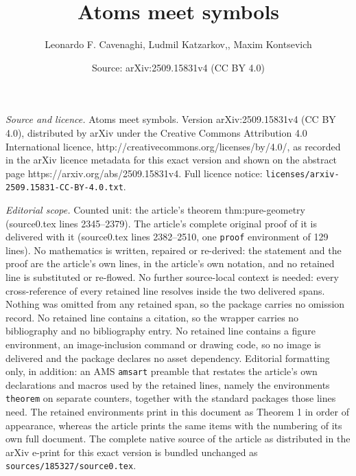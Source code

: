 \documentclass[10pt,a4paper]{amsart}
\title{Atoms meet symbols}
\author{Leonardo F. Cavenaghi, Ludmil Katzarkov,, Maxim Kontsevich}
\date{Source: arXiv:2509.15831v4 (CC BY 4.0)}
\begin{document}
\maketitle

\noindent\emph{Source and licence.} Atoms meet symbols. Version arXiv:2509.15831v4 (CC BY 4.0), distributed by arXiv under the Creative Commons Attribution 4.0 International licence, http://creativecommons.org/licenses/by/4.0/, as recorded in the arXiv licence metadata for this exact version and shown on the abstract page https://arxiv.org/abs/2509.15831v4. Full licence notice: \texttt{licenses/arxiv-2509.15831-CC-BY-4.0.txt}.\par\smallskip

\noindent\textit{Editorial scope.} Counted unit: the article's theorem thm:pure-geometry (source0.tex lines 2345--2379). The article's complete original proof of it is delivered with it (source0.tex lines 2382--2510, one \texttt{proof} environment of 129 lines). No mathematics is written, repaired or re-derived: the statement and the proof are the article's own lines, in the article's own notation, and no retained line is substituted or re-flowed.  No further source-local context is needed: every cross-reference of every retained line resolves inside the two delivered spans.  Nothing was omitted from any retained span, so the package carries no omission record.  No retained line contains a citation, so the wrapper carries no bibliography and no bibliography entry.  No retained line contains a figure environment, an image-inclusion command or drawing code, so no image is delivered and the package declares no asset dependency.  Editorial formatting only, in addition: an AMS \texttt{amsart} preamble that restates the article's own declarations and macros used by the retained lines, namely the environments \texttt{theorem} on separate counters, together with the standard packages those lines need.  The retained environments print in this document as Theorem 1 in order of appearance, whereas the article prints the same items with the numbering of its own full document.  The complete native source of the article as distributed in the arXiv e-print for this exact version is bundled unchanged as \texttt{sources/185327/source0.tex}.
\end{document}
